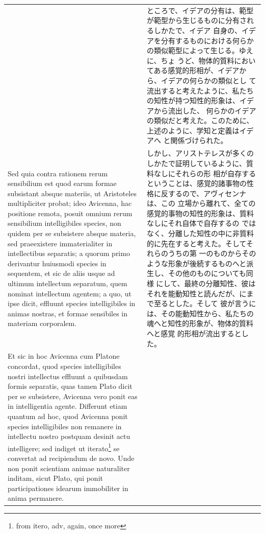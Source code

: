 \documentclass[paper=a4paper,fontsize=10pt,jafontsize=9pt,titlepage]{jlreq}
\begin{document}
\begin{longtable}{p{21em}p{21em}}
&

 ところで、イデアの分有は、範型が範型から生じるものに分有されるしかたで、イデア
 自身の、イデアを分有するものにおける何らかの類似範型によって生じる。ゆえに、ちょ
 うど、物体的質料においてある感覚的形相が、イデアから、イデアの何らかの類似とし
 て流出すると考えたように、私たちの知性が持つ知性的形象は、イデアから流出した、
 何らかのイデアの類似だと考えた。このために、上述のように、学知と定義はイデアへ
 と関係づけられた。


\\[1em]

 Sed quia contra rationem rerum sensibilium est quod earum formae subsistant
 absque materiis, ut Aristoteles multipliciter probat; ideo Avicenna, hac
 positione remota, posuit omnium rerum sensibilium intelligibiles species, non
 quidem per se subsistere absque materia, sed praeexistere immaterialiter in
 intellectibus separatis; a quorum primo derivantur huiusmodi species in
 sequentem, et sic de aliis usque ad ultimum intellectum separatum, quem nominat
 intellectum agentem; a quo, ut ipse dicit, effluunt species intelligibiles in
 animas nostras, et formae sensibiles in materiam corporalem.
 
 &
 
 しかし、アリストテレスが多くのしかたで証明しているように、質料なしにそれらの形
 相が自存するということは、感覚的諸事物の性格に反するので、アヴィセンナは、この
 立場から離れて、全ての感覚的事物の知性的形象は、質料なしにそれ自体で自存するの
 ではなく、分離した知性の中に非質料的に先在すると考えた。そしてそれらのうちの第
 一のものからそのような形象が後続するものへと派生し、その他のものについても同様
 にして、最終の分離知性、彼はそれを能動知性と読んだが、にまで至るとした。そして
 彼が言うには、その能動知性から、私たちの魂へと知性的形象が、物体的質料へと感覚
 的形相が流出するとした。
 



\\[1em]

 Et sic in hoc Avicenna cum Platone concordat, quod species intelligibiles
 nostri intellectus effluunt a quibusdam formis separatis, quas tamen Plato
 dicit per se subsistere, Avicenna vero ponit eas in intelligentia
 agente. Differunt etiam quantum ad hoc, quod Avicenna ponit species
 intelligibiles non remanere in intellectu nostro postquam desinit actu
 intelligere; sed indiget ut iterato\footnote{from itero, adv, again, once
 more} se convertat ad recipiendum de novo. Unde non ponit scientiam animae
 naturaliter inditam, sicut Plato, qui ponit participationes idearum immobiliter
 in anima permanere.


\end{longtable}
\end{document}

